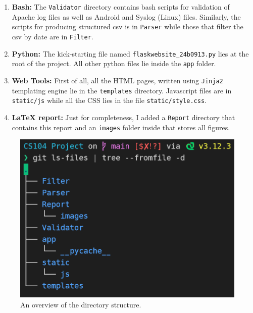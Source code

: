 \documentclass[11pt]{scrartcl}
\begin{document}
\begin{enumerate}
  \item \textbf{Bash:} The \texttt{Validator} directory contains bash scripts
    for validation of Apache log files as well as Android and Syslog (Linux)
    files. Similarly, the scripts for producing structured csv is in
    \texttt{Parser} while those that filter the csv by date are in
    \texttt{Filter}.

  \item \textbf{Python:} The kick-starting file named
    \texttt{flaskwebsite\_24b0913.py} lies at the root of the project. All other
    python files lie inside the \texttt{app} folder.

  \item \textbf{Web Tools:} First of all, all the HTML pages, written using
    \texttt{Jinja2} templating engine lie in the \texttt{templates} directory.
    Javascript files are in \texttt{static/js} while all the CSS lies in the
    file \texttt{static/style.css}.

\item \textbf{{\LaTeX} report:} Just for completeness, I added a \texttt{Report}
    directory that contains this report and an \texttt{images} folder inside
    that stores all figures.
\end{enumerate}

\begin{figure}[htbp]

  \centering
  \includegraphics{images/directory.png}
  \caption{An overview of the directory structure.}
  \label{directory}

\end{figure}
\end{document}
